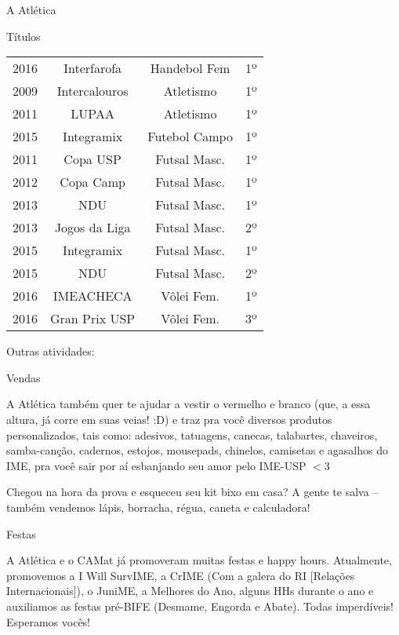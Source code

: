 \begin{secao}{A Atlética}
\begin{subsecao}{Títulos}
\begin{center}
\begin{tabular}{c|c|c|c}
    2016 & Interfarofa    & Handebol Fem    & 1º\\
    2009 & Intercalouros  & Atletismo       & 1º\\
    2011 & LUPAA          & Atletismo       & 1º\\
    2015 & Integramix     & Futebol Campo   & 1º\\
    2011 & Copa USP       & Futsal Masc.    & 1º\\
    2012 & Copa Camp      & Futsal Masc.    & 1º\\
    2013 & NDU            & Futsal Masc.    & 1º\\
    2013 & Jogos da Liga  & Futsal Masc.    & 2º\\
    2015 & Integramix     & Futsal Masc.    & 1º\\
    2015 & NDU            & Futsal Masc.    & 2º\\
    2016 & IMEACHECA      & Vôlei Fem.      & 1º\\
    2016 & Gran Prix USP  & Vôlei Fem.      & 3º
  \end{tabular}
\end{center}

\end{subsecao}
Outras atividades:

\begin{subsecao}{Vendas}

A Atlética também quer te ajudar a vestir o vermelho e branco (que, a essa
altura, já corre em suas veias! :D) e traz pra você diversos produtos
personalizados, tais como: adesivos, tatuagens, canecas, talabartes, chaveiros,
samba-canção, cadernos, estojos, mousepads, chinelos, camisetas e agasalhos do
IME, pra você sair por aí esbanjando seu amor pelo IME-USP $<$3

Chegou na hora da prova e esqueceu seu kit bixo em casa? A gente te salva --
também vendemos lápis, borracha, régua, caneta e calculadora!

\end{subsecao}
\begin{subsecao}{Festas}

A Atlética e o CAMat já promoveram muitas festas e happy hours. Atualmente,
promovemos a I Will SurvIME, a CrIME (Com a galera do RI [Relações
Internacionais]), o JuniME, a Melhores do Ano, alguns HHs durante o ano e
auxiliamos as festas pré-BIFE (Desmame, Engorda e Abate). Todas imperdíveis!
Esperamos vocês!


\end{subsecao}
\end{secao}
